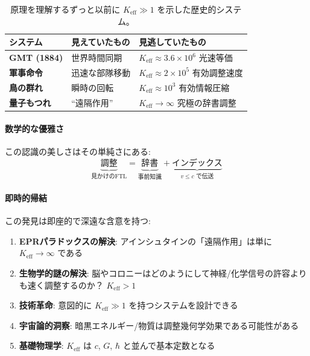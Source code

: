 \documentclass[11pt,a4paper]{article}
\begin{document}
	\begin{table}[htbp]
		\centering

			\begin{tabular}{p{}p{}p{}}
				\toprule
				\textbf{システム} & \textbf{見えていたもの} & \textbf{見逃していたもの} \\
				\midrule
				\textbf{GMT (1884)} & 世界時間同期 & $K_{\mathrm{eff}} \approx 3.6\times10^6$ 光速等価 \\
				\textbf{軍事命令} & 迅速な部隊移動 & $K_{\mathrm{eff}} \approx 2\times10^5$ 有効調整速度 \\
				\textbf{鳥の群れ} & 瞬時の回転 & $K_{\mathrm{eff}} \approx 10^3$ 有効情報圧縮 \\
				\textbf{量子もつれ} & ``遠隔作用'' & $K_{\mathrm{eff}} \to \infty$ 究極の辞書調整 \\
				\bottomrule
			\end{tabular}

		\caption{原理を理解するずっと以前に $K_{\mathrm{eff}} \gg 1$ を示した歴史的システム。}
	\end{table}
	
	\paragraph{数学的な優雅さ}
	この認識の美しさはその単純さにある:
	\begin{equation}
		\underbrace{\text{調整}}_{\text{見かけのFTL}} = 
		\underbrace{\text{辞書}}_{\text{事前知識}} + 
		\underbrace{\text{インデックス}}_{\text{$v \leq c$ で伝送}}
	\end{equation}
	
	\paragraph{即時的帰結}
	この発見は即座的で深遠な含意を持つ:
	
	\begin{enumerate}
		\item \textbf{EPRパラドックスの解決}: アインシュタインの「遠隔作用」は単に $K_{\mathrm{eff}} \to \infty$ である
		
		\item \textbf{生物学的謎の解決}: 脳やコロニーはどのようにして神経/化学信号の許容よりも速く調整するのか？ $K_{\mathrm{eff}} > 1$
		
		\item \textbf{技術革命}: 意図的に $K_{\mathrm{eff}} \gg 1$ を持つシステムを設計できる
		
		\item \textbf{宇宙論的洞察}: 暗黒エネルギー/物質は調整幾何学効果である可能性がある
		
		\item \textbf{基礎物理学}: $K_{\mathrm{eff}}$ は $c$, $G$, $\hbar$ と並んで基本定数となる
	\end{enumerate}
	
\end{document}
